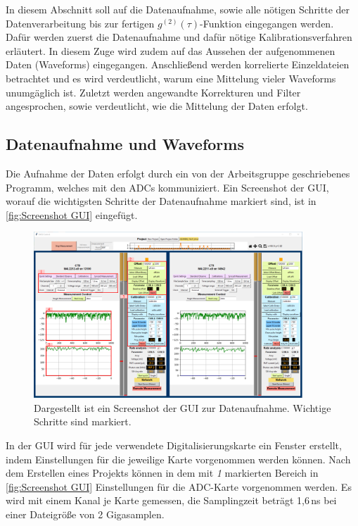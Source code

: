 In diesem Abschnitt soll auf die Datenaufnahme, sowie alle nötigen Schritte der Datenverarbeitung bis zur fertigen $g^{(2)}(\tau)$-Funktion eingegangen werden. 
Dafür werden zuerst die Datenaufnahme und dafür nötige Kalibrationsverfahren erläutert. 
In diesem Zuge wird zudem auf das Aussehen der aufgenommenen Daten (Waveforms) eingegangen. 
Anschließend werden korrelierte Einzeldateien betrachtet und es wird verdeutlicht, warum eine Mittelung vieler Waveforms unumgäglich ist. 
Zuletzt werden angewandte Korrekturen und Filter angesprochen, sowie verdeutlicht, wie die Mittelung der Daten erfolgt. 

\subsection{Datenaufnahme und Waveforms}
\label{ssec:Datenaufnahme und Waveforms}
Die Aufnahme der Daten erfolgt durch ein von der Arbeitsgruppe geschriebenes Programm, welches mit den ADCs kommuniziert. Ein Screenshot der GUI, worauf die wichtigsten Schritte der Datenaufnahme markiert sind, ist in \autoref{fig:Screenshot GUI} eingefügt. 
\begin{figure}[htbp]
    \centering
    \includegraphics[width=0.9\textwidth]{images/Datenaufnahme/GUI.pdf}
    \caption{Dargestellt ist ein Screenshot der GUI zur Datenaufnahme. Wichtige Schritte sind markiert.}
    \label{fig:Screenshot GUI}
\end{figure}
In der GUI wird für jede verwendete Digitalisierungskarte ein Fenster erstellt, indem Einstellungen für die jeweilige Karte vorgenommen werden können. 
Nach dem Erstellen eines Projekts können in dem mit \emph{1} markierten Bereich in \autoref{fig:Screenshot GUI} Einstellungen für die ADC-Karte vorgenommen werden. 
Es wird mit einem Kanal je Karte gemessen, die Samplingzeit beträgt 1,6\,ns bei einer Dateigröße von 2 Gigasamplen. 
